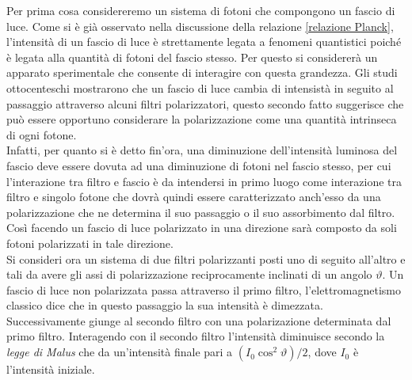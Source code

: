 Per prima cosa considereremo un sistema di fotoni che compongono un fascio di luce.
Come si è già osservato nella discussione della relazione \eqref{relazione Planck}, l'intensità di un fascio di luce è strettamente legata a fenomeni quantistici poiché è legata alla quantità di fotoni del fascio stesso. Per questo si considererà un apparato sperimentale che consente di interagire con questa grandezza. Gli studi ottocenteschi mostrarono che un fascio di luce cambia di intensistà in seguito al passaggio attraverso alcuni filtri polarizzatori, questo secondo fatto suggerisce che può essere opportuno considerare la polarizzazione come una quantità intrinseca di ogni fotone.\\
 Infatti, per quanto si è detto fin'ora, una diminuzione dell'intensità luminosa del fascio deve essere dovuta ad una diminuzione di fotoni nel fascio stesso, per cui l'interazione tra filtro e fascio è da intendersi in primo luogo come interazione tra filtro e singolo fotone che dovrà quindi essere caratterizzato anch'esso da una polarizzazione che ne determina il suo passaggio o il suo assorbimento dal filtro. Così facendo un fascio di luce polarizzato in una direzione sarà composto da soli fotoni polarizzati in tale direzione.\\
Si consideri ora un sistema di due filtri polarizzanti posti uno di seguito all'altro e tali da avere gli assi di polarizzazione reciprocamente inclinati di un angolo $\vartheta$. Un fascio di luce non polarizzata passa attraverso il primo filtro, l'elettromagnetismo classico dice che in questo passaggio la sua intensità è dimezzata. Successivamente giunge al secondo filtro con una polarizazione determinata dal primo filtro. Interagendo con il secondo filtro l'intensità diminuisce secondo la \emph{legge di Malus} che da un'intensità finale pari a $(I_0 \cos^2\vartheta)/2$, dove $I_0$ è l'intensità iniziale.
\begin{figure}[H]
    \centering
\end{figure}
